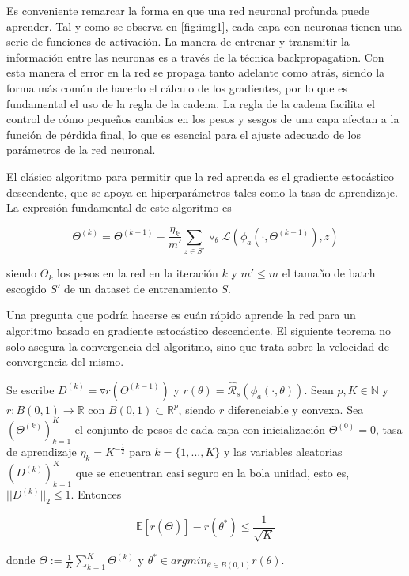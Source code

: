 


Es conveniente remarcar la forma en que una red neuronal profunda puede aprender. Tal y como se observa en \ref{fig:img1}, cada capa con neuronas tienen una serie de funciones de activación. La manera de entrenar y transmitir la información entre las neuronas es a través de la técnica backpropagation. Con esta manera el error en la red se propaga tanto adelante como atrás, siendo la forma más común de hacerlo el cálculo de los gradientes, por lo que es fundamental el uso de la regla de la cadena. La regla de la cadena facilita el control de cómo pequeños cambios en los pesos y sesgos de una capa afectan a la función de pérdida final, lo que es esencial para el ajuste adecuado de los parámetros de la red neuronal.

El clásico algoritmo para permitir que la red aprenda es el gradiente estocástico descendente, que se apoya en hiperparámetros tales como la tasa de aprendizaje. La expresión fundamental de este algoritmo es 

$$\Theta^{(k)} = \Theta^{(k-1)} - \frac{\eta_k}{m'}\sum_{z \in S'} \triangledown_\theta\mathcal{L}(\phi_a(\cdot,\Theta^{(k-1)}),z) $$

siendo $\Theta_k$ los pesos en la red en la iteración $k$ y $m' \leq m$ el tamaño de batch escogido $S'$ de un dataset de entrenamiento $S$.

Una pregunta que podría hacerse es cuán rápido aprende la red para un algoritmo basado en gradiente estocástico descendente. El siguiente teorema no solo asegura la convergencia del algoritmo, sino que trata sobre la velocidad de convergencia del mismo.

\begin{teorema}
Se escribe $D^{(k)}=\triangledown r(\Theta^{(k-1)})$ y $r(\theta)=\hat{\mathcal{R}}_s(\phi_a(\cdot,\theta))$. Sean $p,K \in \mathbb{N}$ y $r:B(0,1) \to \mathbb{R}$ con $B(0,1) \subset \mathbb{R}^p$, siendo $r$ diferenciable y convexa. Sea $(\Theta^{(k)})_{k=1}^{K}$ el conjunto de pesos de cada capa con inicialización $\Theta^{(0)}=0$, tasa de aprendizaje $\eta_k=K^{-\frac{1}{2}}$ para $k=\{1,...,K\}$ y las variables aleatorias $(D^{(k)})_{k=1}^{K}$ que se encuentran casi seguro en la bola unidad, esto es, $||D^{(k)}||_2 \leq 1$. Entonces


$$\mathbb{E}[r(\overline{\Theta})] - r(\theta^*) \leq \frac{1}{\sqrt{K}}$$

donde $\overline{\Theta} := \frac{1}{K} \sum_{k=1}^{K} \Theta^{(k)}$ y $\theta^* \in argmin_{\theta \in B(0,1)} r(\theta)$.
\end{teorema}


